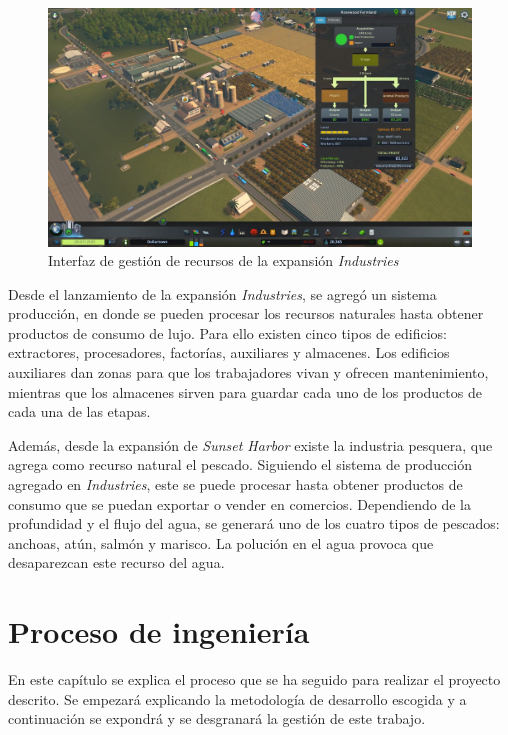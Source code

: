 \begin{figure}[h]
	\centering
	\includegraphics[width=\textwidth]{images/industries}
	\caption{Interfaz de gestión de recursos de la expansión \textit{Industries}}
	\label{fig:industry}
\end{figure}


Desde el lanzamiento de la expansión \textit{Industries}, se agregó un sistema producción, en donde se pueden procesar los recursos naturales hasta obtener productos de consumo de lujo. Para ello existen cinco tipos de edificios: extractores, procesadores, factorías, auxiliares y almacenes. Los edificios auxiliares dan zonas para que los trabajadores vivan y ofrecen mantenimiento, mientras que los almacenes sirven para guardar cada uno de los productos de cada una de las etapas.

Además, desde la expansión de \textit{Sunset Harbor} existe la industria pesquera, que agrega como recurso natural el pescado. Siguiendo el sistema de producción agregado en \textit{Industries}, este se puede procesar hasta obtener productos de consumo que se puedan exportar o vender en comercios. Dependiendo de la profundidad y el flujo del agua, se generará uno de los cuatro tipos de pescados: anchoas, atún, salmón y marisco. La polución en el agua provoca que desaparezcan este recurso del agua.

\section{Proceso de ingeniería}

En este capítulo se explica el proceso que se ha seguido para realizar el proyecto descrito. Se empezará explicando la metodología de desarrollo escogida y a continuación se expondrá y se desgranará la gestión de este trabajo.

